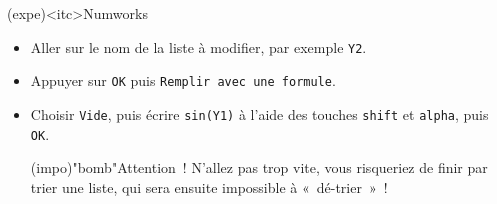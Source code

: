 \documentclass[a4paper, 12pt, garamond]{book}
\begin{document}
\begin{tcn}(expe)<itc>{Numworks}
	\begin{itemize}
		\item Aller sur le nom de la liste à modifier, par exemple \texttt{Y2}.
		\item Appuyer sur \texttt{OK} puis \texttt{Remplir avec une formule}.
		\item Choisir \texttt{Vide}, puis écrire \texttt{sin(Y1)} à l'aide des
		      touches \texttt{shift} et \texttt{alpha}, puis \texttt{OK}.
		      \begin{center}
			      \begin{tcn}[width=.8\linewidth](impo)"bomb"{Attention~!}
				      N'allez pas trop vite, vous risqueriez de finir par trier une liste,
				      qui sera ensuite impossible à «~dé-trier~»~!
			      \end{tcn}
		      \end{center}
	\end{itemize}
\end{tcn}
\vspace{-15pt}
\end{document}
